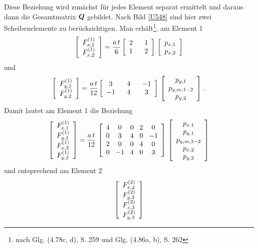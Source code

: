 {Diese Beziehung wird zun\"{a}chst f\"{u}r jedes Element separat ermittelt und daraus dann die Gesamtmatrix $\mbox{\boldmath $Q$} $ gebildet. Nach Bild \ref{U548} sind hier zwei Scheibenelemente zu ber\"{u}cksichtigen. Man erh\"{a}lt\footnote{nach \cite{Werkle2} Glg. (4.78c, d), S. 259 und Glg. (4.86a, b), S. 262}, am Element 1
\begin{align}
\left[\barr{c} F_{x,1}^{(1)} \\ F_{x,2}^{(1)} \earr \right] =
\frac{a\,t}{6} \left[\barr{c @{\hspace{6mm}} c} 2 & 1 \\ 1 &2  \earr \right]\,\left[\barr{c} p_{x,1}\\ p_{x,2} \earr \right]
\end{align}
und
\begin{align}
\left[\barr{c} F_{y,1}^{(1)} \\ F_{y,2}^{(1)} \earr \right] =
\frac{a\,t}{12} \left[\barr{c @{\hspace{6mm}} c @{\hspace{6mm}} c} 3 & 4 &-1 \\ -1 &4 &3  \earr \right]\,\left[\barr{c} p_{y,1} \\ p_{y,m,1-2} \\ p_{y,2} \earr \right]\,.
\end{align}
Damit lautet am Element 1 die Beziehung
\begin{align}
\left[\barr{c} F_{x,1}^{(1)} \\ F_{y,1}^{(1)} \\ F_{x,2}^{(1)} \\ F_{y,2}^{(1)}\earr \right]
= \frac{ a\,t}{12}\,\left[\barr{c @{\hspace{3mm}} c @{\hspace{3mm}} c @{\hspace{3mm}} c @{\hspace{3mm}} c} 4 & 0 & 0 &2 & 0 \\ 0 & 3 & 4 &0 & -1\\  2 & 0 & 0 &4 & 0 \\
 0 & -1 & 4 &0 & 3  \earr \right]\,\left[\barr{c} p_{x,1} \\ p_{y,1} \\ p_{y,m,1-2} \\ p_{x,2} \\ p_{y,2} \earr \right]
\end{align}
und entsprechend am Element 2
\begin{align}
\left[\barr{c} F_{x,2}^{(2)} \\ F_{y,2}^{(2)} \\ F_{x,3}^{(2)} \\ F_{y,3}^{(2)}\earr \right]

\end{align}}
